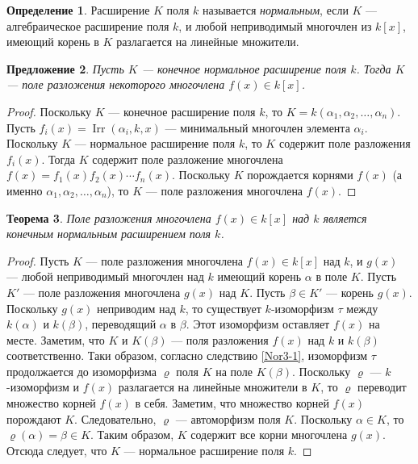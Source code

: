 \documentclass[12pt, titlepage, oneside]{amsbook}
\newcommand{\Irr}{\operatorname{Irr}}
\newtheorem{theorem}{Теорема}[chapter]
\newtheorem{proposition}[theorem]{Предложение}
\theoremstyle{definition}
\newtheorem{definition}[theorem]{Определение}
\theoremstyle{remark}
\begin{document}
\begin{definition}
Расширение $K$ поля $k$ называется \emph{нормальным}, если $K$ --- алгебраическое расширение поля $k$, и любой неприводимый многочлен из $k[x]$, имеющий корень в $K$ разлагается на линейные множители.
\end{definition}

\begin{proposition}
\label{Nor4}
Пусть $K$ --- конечное нормальное расширение поля $k$. Тогда $K$ --- поле разложения некоторого многочлена $f(x)\in k[x]$.
\end{proposition}

\begin{proof}
Поскольку $K$ --- конечное расширение поля $k$, то $K=k(\alpha_1,\alpha_2,\ldots,\alpha_n)$. Пусть $f_i(x)=\Irr(\alpha_i,k,x)$ --- минимальный многочлен элемента $\alpha_i$. Поскольку $K$ --- нормальное расширение поля $k$, то $K$ содержит поле разложения $f_i(x)$. Тогда  $K$ содержит поле разложение многочлена $f(x)=f_1(x) f_2(x)\cdots f_n(x)$. Поскольку $K$ порождается корнями $f(x)$ (а именно $\alpha_1,\alpha_2,\ldots,\alpha_n$), то $K$ --- поле разложения многочлена $f(x)$.
\end{proof}

\begin{theorem}
\label{Nor5}
Поле разложения многочлена $f(x)\in k[x]$ над $k$ является конечным нормальным расширением поля $k$.
\end{theorem}

\begin{proof}
Пусть $K$ --- поле разложения многочлена $f(x)\in k[x]$ над $k$, и $g(x)$ --- любой неприводимый многочлен над $k$ имеющий корень $\alpha$ в поле $K$. Пусть $K'$ --- поле разложения многочлена $g(x)$ над $K$. Пусть $\beta\in K'$ --- корень $g(x)$. Поскольку $g(x)$ неприводим над $k$, то существует $k$-изоморфизм $\tau$ между $k(\alpha)$ и $k(\beta)$, переводящий $\alpha$ в $\beta$. Этот изоморфизм оставляет $f(x)$ на месте. Заметим, что $K$ и $K(\beta)$ --- поля разложения $f(x)$ над $k$ и $k(\beta)$ соответственно. Таки образом, согласно следствию \ref{Nor3-1}, изоморфизм $\tau$ продолжается до изоморфизма $\varrho$ поля $K$ на поле $K(\beta)$. Поскольку $\varrho$ --- $k$-изоморфизм и $f(x)$ разлагается на линейные множители в $K$, то $\varrho$ переводит множество корней $f(x)$ в себя. Заметим, что множество корней $f(x)$ порождают $K$. Следовательно, $\varrho$ --- автоморфизм поля $K$. Поскольку $\alpha\in K$, то $\varrho(\alpha)=\beta\in K$. Таким образом, $K$ содержит все корни многочлена $g(x)$. Отсюда следует, что $K$ --- нормальное расширение поля $k$.
\end{proof}
\end{document}
